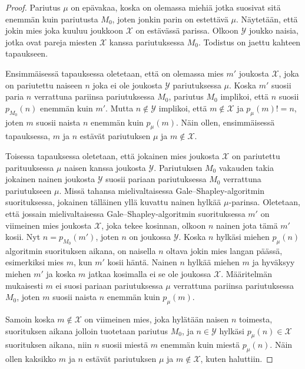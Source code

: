 \documentclass[finnish]{tktltiki2}
\theoremstyle{definition}
\theoremstyle{remark}
\begin{document}
\begin{proof}\cite[s. 55]{gusfield1989stable}\label{strategy-blockingtod}
	Pariutus $\mu$ on epävakaa, koska on olemassa miehiä jotka suosivat sitä enemmän kuin pariutusta $M_0$, joten jonkin parin on estettävä $\mu$. Näytetään, että jokin mies joka kuuluu joukkoon $\mathcal{X}$ on estävässä parissa. Olkoon $\mathcal{Y}$ joukko naisia, jotka ovat pareja miesten $\mathcal{X}$ kanssa pariutuksessa $M_0$. Todistus on jaettu kahteen tapaukseen.
	
	Ensimmäisessä tapauksessa oletetaan, että on olemassa mies $m'$ joukosta $\mathcal{X}$, joka on pariutettu naiseen $n$ joka ei ole joukosta $\mathcal{Y}$ pariutuksessa $\mu$. Koska $m'$ suosii paria $n$ verrattuna pariinsa pariutuksessa $M_0$, pariutus $M_0$ implikoi, että $n$ suosii $p_{M_0}(n)$ enemmän kuin $m'$. Mutta $n \notin \mathcal{Y}$ implikoi, että $m \notin \mathcal{X}$ ja $p_\mu(m) != n$, joten $m$ suosii naista $n$ enemmän kuin $p_\mu(m)$. Näin ollen, ensimmäisessä tapauksessa, $m$ ja $n$ estävät pariutuksen $\mu$ ja $m \notin \mathcal{X}$.
	
	Toisessa tapauksessa oletetaan, että jokainen mies joukosta $\mathcal{X}$ on pariutettu parituuksessa $\mu$ naisen kanssa joukosta $\mathcal{Y}$. Pariutuksen $M_0$ vakauden takia jokainen nainen joukosta $\mathcal{Y}$ suosii pariaan pariutuksessa $M_0$ verrattuna pariutukseen $\mu$. Missä tahansa mielivaltaisessa Gale--Shapley-algoritmin suorituksessa, jokainen tälläinen yllä kuvattu nainen hylkää $\mu$-parinsa. Oletetaan, että jossain mielivaltaisessa Gale--Shapley-algoritmin suorituksessa $m'$ on viimeinen mies joukosta $\mathcal{X}$, joka tekee kosinnan, olkoon $n$ nainen jota tämä $m'$ kosii. Nyt $n = p_{M_0}(m')$, joten $n$ on joukossa $\mathcal{Y}$. Koska $n$ hylkäsi miehen $p_\mu(n)$ algoritmin suorituksen aikana, on naisella $n$ oltava jokin mies langan päässä, esimerkiksi mies $m$, kun $m'$ kosii häntä. Nainen $n$ hylkää miehen $m$ ja hyväksyy miehen $m'$ ja koska $m$ jatkaa kosimalla ei se ole joukossa $\mathcal{X}$. Määritelmän mukaisesti $m$ ei suosi pariaan pariutuksessa $\mu$ verrattuna pariinsa pariutuksessa $M_0$, joten $m$ suosii naista $n$ enemmän kuin $p_\mu(m)$.
	
	Samoin koska $m \notin \mathcal{X}$ on viimeinen mies, joka hylätään naisen $n$ toimesta, suorituksen aikana jolloin tuotetaan pariutus $M_0$, ja $n \in \mathcal{Y}$ hylkäsi $p_\mu(n) \in \mathcal{X}$ suorituksen aikana, niin $n$ suosii miestä $m$ enemmän kuin miestä $p_\mu(n)$. Näin ollen kaksikko $m$ ja $n$ estävät pariutuksen $\mu$ ja $m \notin \mathcal{X}$, kuten haluttiin.	
\end{proof}
\end{document}
